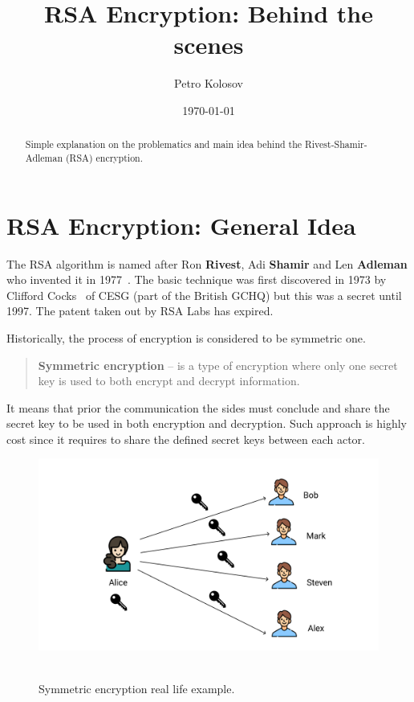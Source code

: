 \documentclass[12pt,letterpaper,oneside,reqno]{amsart}
\title[RSA Encryption: Behind the scenes]{RSA Encryption: Behind the scenes}
\author[Petro Kolosov]{Petro Kolosov}
\date{\today}
\begin{document}
    \begin{abstract}
        Simple explanation on the problematics and main idea behind the Rivest-Shamir-Adleman (RSA) encryption.
    \end{abstract}
    \maketitle
    \tableofcontents


    \section{RSA Encryption: General Idea}\label{sec:rsa-encryption-algorithm}
    The RSA algorithm is named after Ron \textbf{Rivest}, Adi \textbf{Shamir} and Len \textbf{Adleman}
    who invented it in 1977~\cite{rivest1978method}.
    The basic technique was first discovered in 1973 by Clifford Cocks~\cite{cocks1973note} of CESG (part of the British GCHQ)
    but this was a secret until 1997.
    The patent taken out by RSA Labs has expired.

    Historically, the process of encryption is considered to be symmetric one.
    \begin{quote}
        \textbf{Symmetric encryption} -- is a type of encryption where only one secret key is
        used to both encrypt and decrypt information.
    \end{quote}
    It means that prior the communication the sides must conclude and share the secret key to be used in
    both encryption and decryption.
    Such approach is highly cost since it requires to share the defined secret keys between each actor.

    \begin{figure}[H]
        \centering
        \includegraphics[width=1\textwidth]{Symmetric_encryption}
        ~\caption{Symmetric encryption real life example.}\label{fig:figure}
    \end{figure}
\end{document}
